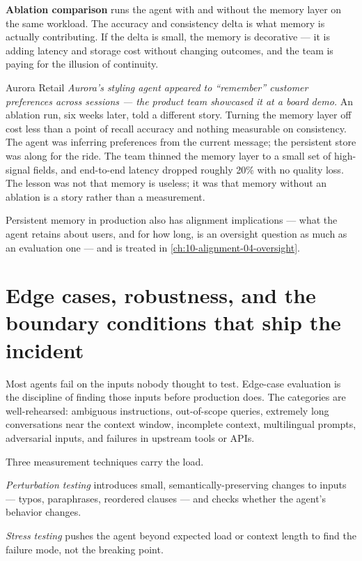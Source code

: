 \textbf{Ablation comparison} runs the agent with and without the memory layer on the same workload. The accuracy and consistency delta is what memory is actually contributing. If the delta is small, the memory is decorative --- it is adding latency and storage cost without changing outcomes, and the team is paying for the illusion of continuity.

\begin{TNinpractice}{Aurora Retail}
\textit{Aurora's styling agent appeared to ``remember'' customer preferences across sessions --- the product team showcased it at a board demo.} An ablation run, six weeks later, told a different story. Turning the memory layer off cost less than a point of recall accuracy and nothing measurable on consistency. The agent was inferring preferences from the current message; the persistent store was along for the ride. The team thinned the memory layer to a small set of high-signal fields, and end-to-end latency dropped roughly 20\% with no quality loss. The lesson was not that memory is useless; it was that memory without an ablation is a story rather than a measurement.
\end{TNinpractice}

Persistent memory in production also has alignment implications --- what the agent retains about users, and for how long, is an oversight question as much as an evaluation one --- and is treated in \autoref{ch:10-alignment-04-oversight}.

\section{Edge cases, robustness, and the boundary conditions that ship the incident}

Most agents fail on the inputs nobody thought to test. Edge-case evaluation is the discipline of finding those inputs before production does. The categories are well-rehearsed: ambiguous instructions, out-of-scope queries, extremely long conversations near the context window, incomplete context, multilingual prompts, adversarial inputs, and failures in upstream tools or APIs.

Three measurement techniques carry the load.

\textit{Perturbation testing} introduces small, semantically-preserving changes to inputs --- typos, paraphrases, reordered clauses --- and checks whether the agent's behavior changes.

\textit{Stress testing} pushes the agent beyond expected load or context length to find the failure mode, not the breaking point.


